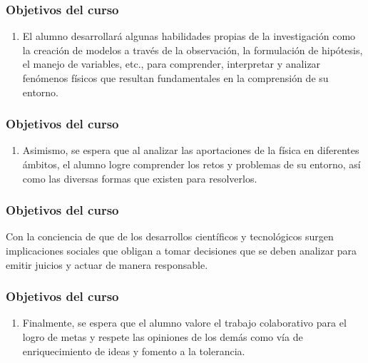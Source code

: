 \documentclass[14pt]{beamer}
\begin{document}
\begin{frame}
\frametitle{Objetivos del curso}
\begin{enumerate}[<+->]
\item El alumno desarrollará algunas habilidades propias de la investigación como la creación de modelos a través de la observación, la formulación de hipótesis, el manejo de variables, etc., \pause para comprender, interpretar y analizar fenómenos físicos que resultan fundamentales en la comprensión de su entorno.
\seti
\end{enumerate}
\end{frame}
\begin{frame}
\frametitle{Objetivos del curso}
\begin{enumerate}[<+->]    
\conti
\item Asimismo, se espera que al analizar las aportaciones de la física en diferentes ámbitos, el alumno logre comprender los retos y problemas de su entorno, así como las diversas formas que existen para resolverlos.
\seti
\end{enumerate}
\end{frame}
\begin{frame}
\frametitle{Objetivos del curso}
Con la conciencia de que de los desarrollos científicos y tecnológicos surgen implicaciones sociales que obligan a tomar decisiones que se deben analizar para emitir juicios y actuar de manera responsable.
\end{frame}
\begin{frame}
\frametitle{Objetivos del curso}
\begin{enumerate}[<+->]    
\conti
\item Finalmente, se espera que el alumno valore el trabajo colaborativo para el logro de metas y respete las opiniones de los demás como vía de enriquecimiento de ideas y fomento a la tolerancia.
\end{enumerate}
\end{frame}
\end{document}
